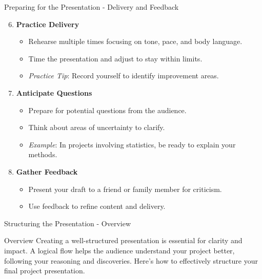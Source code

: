 \documentclass[aspectratio=169]{beamer}
\begin{document}
\begin{frame}[fragile]{Preparing for the Presentation - Delivery and Feedback}
    \begin{enumerate}[resume]
        \setcounter{enumi}{5}
        \item \textbf{Practice Delivery}
        \begin{itemize}
            \item Rehearse multiple times focusing on tone, pace, and body language.
            \item Time the presentation and adjust to stay within limits.
            \item \textit{Practice Tip}: Record yourself to identify improvement areas.
        \end{itemize}

        \item \textbf{Anticipate Questions}
        \begin{itemize}
            \item Prepare for potential questions from the audience.
            \item Think about areas of uncertainty to clarify.
            \item \textit{Example}: In projects involving statistics, be ready to explain your methods.
        \end{itemize}

        \item \textbf{Gather Feedback}
        \begin{itemize}
            \item Present your draft to a friend or family member for criticism.
            \item Use feedback to refine content and delivery.
        \end{itemize}
    \end{enumerate}
\end{frame}

\begin{frame}[fragile]{Structuring the Presentation - Overview}
    \begin{block}{Overview}
        Creating a well-structured presentation is essential for clarity and impact. A logical flow helps the audience understand your project better, following your reasoning and discoveries. Here’s how to effectively structure your final project presentation.
    \end{block}
\end{frame}
\end{document}
